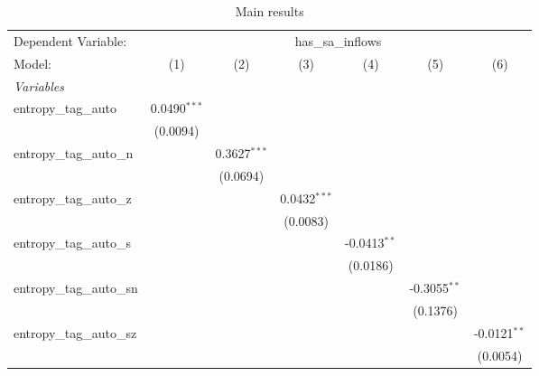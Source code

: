 
\begin{table}[htbp]
   \centering
   \footnotesize
   \begin{threeparttable}[b]
      \caption{\label{tab:reg_has_sa_inflows_tag_auto.tex} Main results}
      \begin{tabular}{lcccccc}
         \tabularnewline \midrule \midrule
         Dependent Variable: & \multicolumn{6}{c}{has\_sa\_inflows}\\
         Model:                    & (1)            & (2)            & (3)            & (4)            & (5)            & (6)\\  
         \midrule
         \emph{Variables}\\
         entropy\_tag\_auto        & 0.0490$^{***}$ &                &                &                &                &   \\   
                                   & (0.0094)       &                &                &                &                &   \\   
         entropy\_tag\_auto\_n     &                & 0.3627$^{***}$ &                &                &                &   \\   
                                   &                & (0.0694)       &                &                &                &   \\   
         entropy\_tag\_auto\_z     &                &                & 0.0432$^{***}$ &                &                &   \\   
                                   &                &                & (0.0083)       &                &                &   \\   
         entropy\_tag\_auto\_s     &                &                &                & -0.0413$^{**}$ &                &   \\   
                                   &                &                &                & (0.0186)       &                &   \\   
         entropy\_tag\_auto\_sn    &                &                &                &                & -0.3055$^{**}$ &   \\   
                                   &                &                &                &                & (0.1376)       &   \\   
         entropy\_tag\_auto\_sz    &                &                &                &                &                & -0.0121$^{**}$\\   
                                   &                &                &                &                &                & (0.0054)\\   

\end{tabular}
\end{threeparttable}
\end{table}
